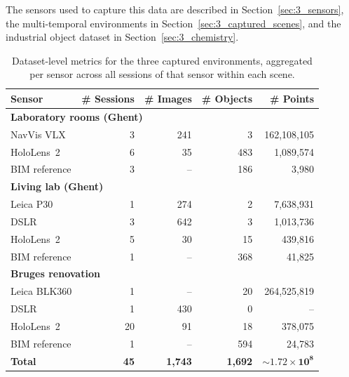 The sensors used to capture this data are described in Section~\ref{sec:3_sensors}, the multi-temporal environments in Section~\ref{sec:3_captured_scenes}, and the industrial object dataset in Section~\ref{sec:3_chemistry}.

\begin{table}[htbp]
    \centering
    \caption[Captured scenes dataset metrics]{Dataset-level metrics for the three captured environments, aggregated per sensor across all sessions of that sensor within each scene.}
    \label{tab:3_captured_scenes_metrics}
    \begin{tabularx}{\textwidth}{X r r r r}
        \toprule
        \textbf{Sensor} & \textbf{\# Sessions} & \textbf{\# Images} & \textbf{\# Objects} & \textbf{\# Points} \\
        \midrule
        \multicolumn{5}{l}{\textbf{Laboratory rooms (Ghent)}} \\
        \midrule
        NavVis VLX              & 3  & 241 & 3   & 162{,}108{,}105 \\
        HoloLens~2              & 6  & 35  & 483 & 1{,}089{,}574   \\
        BIM reference           & 3  & --  & 186 & 3{,}980         \\
        \midrule
        \multicolumn{5}{l}{\textbf{Living lab (Ghent)}} \\
        \midrule
        Leica P30               & 1  & 274 & 2   & 7{,}638{,}931 \\
        DSLR                    & 3  & 642 & 3   & 1{,}013{,}736 \\
        HoloLens~2              & 5  & 30  & 15  & 439{,}816     \\
        BIM reference           & 1  & --  & 368 & 41{,}825      \\
        \midrule
        \multicolumn{5}{l}{\textbf{Bruges renovation}} \\
        \midrule
        Leica BLK360            & 1  & --  & 20  & 264{,}525{,}819 \\
        DSLR                    & 1  & 430 & 0   & --              \\
        HoloLens~2              & 20 & 91  & 18  & 378{,}075       \\
        BIM reference           & 1  & --  & 594 & 24{,}783        \\
        \midrule
        \textbf{Total} & \textbf{45} & \textbf{1{,}743} & \textbf{1{,}692} & $\sim \mathbf{1.72\times 10^{8}}$ \\
        \bottomrule
    \end{tabularx}
\end{table}

